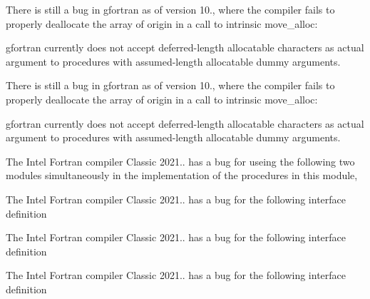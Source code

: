 
\begin{DoxyRefList}
\item[Type \mbox{\hyperlink{interfaceArrayComparison__mod_1_1iseqall}{Array\+Comparison\+\_\+mod\+::iseqall}} ]\label{bug__bug000001}%
%
 There is still a bug in gfortran as of version 10., where the compiler fails to properly deallocate the array of origin in a call to intrinsic {\ttfamily move\+\_\+alloc}\+: 

\label{bug__bug000002}%
%
 gfortran currently does not accept deferred-\/length allocatable characters as actual argument to procedures with assumed-\/length allocatable dummy arguments. 
\item[Type \mbox{\hyperlink{interfaceArrayRemap__mod_1_1remap}{Array\+Remap\+\_\+mod\+::remap}} ]\label{bug__bug000003}%
%
 There is still a bug in gfortran as of version 10., where the compiler fails to properly deallocate the array of origin in a call to intrinsic {\ttfamily move\+\_\+alloc}\+: 

\label{bug__bug000004}%
%
 gfortran currently does not accept deferred-\/length allocatable characters as actual argument to procedures with assumed-\/length allocatable dummy arguments. 
\item[Module \mbox{\hyperlink{namespaceArrayRemove__mod}{Array\+Remove\+\_\+mod}} ]\label{bug__bug000005}%
%
 The Intel Fortran compiler Classic 2021.. has a bug for {\ttfamily use}ing the following two modules simultaneously in the implementation of the procedures in this module,  
\item[Type \mbox{\hyperlink{interfaceArrayRemove__mod_1_1genRemoved}{Array\+Remove\+\_\+mod\+::gen\+Removed}} ]\label{bug__bug000006}%
%
 The Intel Fortran compiler Classic 2021.. has a bug for the following interface definition  
\item[Type \mbox{\hyperlink{interfaceArrayReplace__mod_1_1genReplaced}{Array\+Replace\+\_\+mod\+::gen\+Replaced}} ]\label{bug__bug000007}%
%
 The Intel Fortran compiler Classic 2021.. has a bug for the following interface definition  
\item[Type \mbox{\hyperlink{interfaceArrayUnique__mod_1_1genUnique}{Array\+Unique\+\_\+mod\+::gen\+Unique}} ]\label{bug__bug000011}%
%
 The Intel Fortran compiler Classic 2021.. has a bug for the following interface definition 
\end{DoxyRefList}